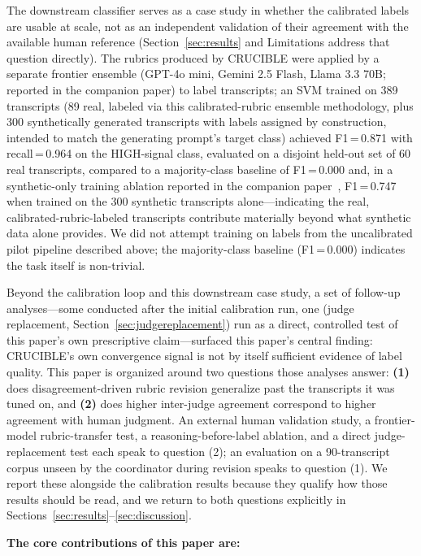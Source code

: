 \documentclass[11pt]{article}
\begin{document}
The downstream classifier serves as a case study in whether the calibrated
labels are usable at scale, not as an independent validation of their
agreement with the available human reference (Section~\ref{sec:results}
and Limitations address that question directly). The rubrics produced by
CRUCIBLE were applied by a
separate frontier ensemble (GPT-4o mini, Gemini 2.5 Flash, Llama 3.3 70B;
reported in the companion paper) to label transcripts; an SVM trained on
389 transcripts (89 real, labeled via this calibrated-rubric ensemble
methodology, plus 300 synthetically generated transcripts with labels
assigned by construction, intended to match the generating prompt's target
class) achieved F1\,=\,0.871 with recall\,=\,0.964 on the
HIGH-signal class, evaluated on a disjoint held-out set of 60 real
transcripts, compared to a majority-class baseline of F1\,=\,0.000 and, in
a synthetic-only training ablation reported in the companion
paper~\cite{dasSNR2026}, F1\,=\,0.747 when trained on the 300 synthetic
transcripts alone---indicating the real, calibrated-rubric-labeled
transcripts contribute materially beyond what synthetic data alone
provides. We did not attempt training on labels from the uncalibrated pilot
pipeline described above; the majority-class baseline (F1\,=\,0.000)
indicates the task itself is non-trivial.

Beyond the calibration loop and this downstream case study, a set of
follow-up analyses---some conducted after the initial calibration run,
one (judge replacement, Section~\ref{sec:judgereplacement}) run as a
direct, controlled test of this paper's own prescriptive claim---surfaced
this paper's central finding: CRUCIBLE's own convergence signal is not by
itself sufficient evidence of label quality. This paper is organized around
two questions those analyses answer: \textbf{(1)} does disagreement-driven
rubric revision generalize past the transcripts it was tuned on, and
\textbf{(2)} does higher inter-judge agreement correspond to higher
agreement with human judgment. An external human validation study, a
frontier-model rubric-transfer test, a reasoning-before-label ablation, and
a direct judge-replacement test each speak to question (2); an evaluation
on a 90-transcript corpus unseen by the coordinator during revision speaks
to question (1). We report these alongside the calibration results because
they qualify how those results should be read, and we return to both
questions explicitly in Sections~\ref{sec:results}--\ref{sec:discussion}.

\textbf{The core contributions of this paper are:}
\end{document}
